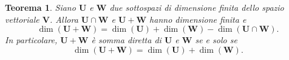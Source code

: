 \documentclass{article}
\theoremstyle{plain}
\newtheorem{thm}{Teorema}[section]
\theoremstyle{definition}
\theoremstyle{remark}
\begin{document}
\vspace{10pt}

\begin{bxthm}
\begin{thm}
    Siano \(\mathbf{U}\) e \(\mathbf{W}\) due sottospazi di dimensione finita dello spazio vettoriale \(\mathbf{V}\). 
    Allora \(\mathbf{U} \cap \mathbf{W}\) e \(\mathbf{U} + \mathbf{W}\) hanno dimensione finita e
    \begin{equation}\label{formula:grassmann_vett}
        \dim(\mathbf{U} + \mathbf{W}) = \dim(\mathbf{U}) + \dim(\mathbf{W}) - \dim(\mathbf{U} \cap \mathbf{W}).
    \end{equation}
    In particolare, \(\mathbf{U} + \mathbf{W}\) è somma diretta di \(\mathbf{U}\) e \(\mathbf{W}\) se e solo se
    \[
        \dim(\mathbf{U} + \mathbf{W}) = \dim(\mathbf{U}) + \dim(\mathbf{W}).
    \]
\end{thm}
\end{bxthm}
\end{document}
